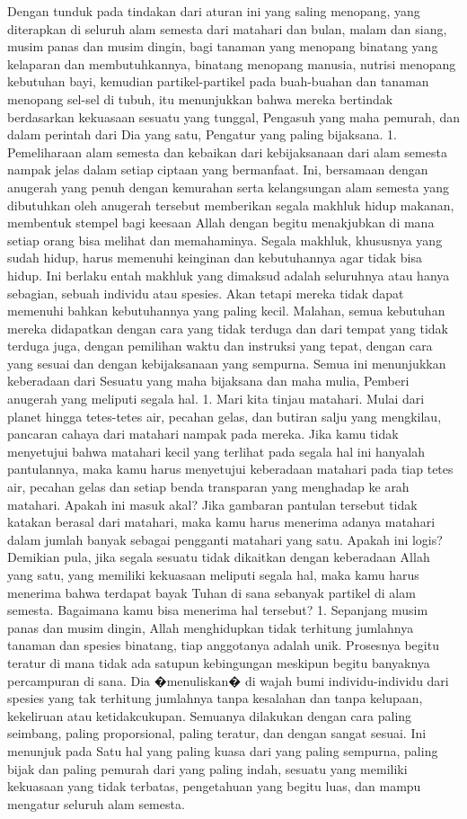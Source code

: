 \documentclass[]{article}
\begin{document}
Dengan tunduk pada tindakan dari aturan ini yang saling menopang, yang diterapkan di seluruh alam semesta dari matahari dan bulan, malam dan siang, musim panas dan musim dingin, bagi tanaman yang menopang binatang yang kelaparan dan membutuhkannya, binatang menopang manusia, nutrisi menopang kebutuhan bayi, kemudian partikel-partikel  pada buah-buahan dan tanaman menopang sel-sel di tubuh, itu  menunjukkan bahwa mereka bertindak berdasarkan kekuasaan sesuatu yang tunggal, Pengasuh yang maha pemurah, dan dalam perintah dari Dia yang satu, Pengatur yang paling bijaksana. 
1. Pemeliharaan alam semesta dan kebaikan dari kebijaksanaan dari alam semesta nampak jelas dalam setiap ciptaan yang bermanfaat.  Ini, bersamaan dengan anugerah yang penuh dengan kemurahan serta kelangsungan alam semesta yang dibutuhkan oleh anugerah tersebut memberikan segala makhluk hidup makanan,  membentuk stempel bagi keesaan Allah dengan begitu menakjubkan di mana setiap orang bisa melihat dan memahaminya.
Segala makhluk, khususnya yang sudah hidup, harus memenuhi keinginan dan kebutuhannya agar tidak bisa hidup. Ini berlaku entah makhluk yang dimaksud adalah seluruhnya atau hanya sebagian, sebuah individu atau spesies. Akan tetapi mereka tidak dapat memenuhi bahkan kebutuhannya yang paling kecil. Malahan, semua kebutuhan mereka didapatkan dengan cara yang tidak terduga dan dari tempat yang tidak terduga juga, dengan pemilihan waktu dan instruksi yang tepat, dengan cara yang sesuai dan dengan kebijaksanaan yang sempurna. Semua ini menunjukkan keberadaan dari Sesuatu yang maha bijaksana dan maha mulia, Pemberi anugerah yang meliputi segala hal. 
1. Mari kita tinjau matahari. Mulai dari planet hingga tetes-tetes air, pecahan gelas, dan butiran salju yang mengkilau, pancaran cahaya dari matahari nampak pada mereka. Jika kamu tidak menyetujui bahwa matahari kecil yang  terlihat pada segala hal ini  hanyalah pantulannya, maka kamu harus menyetujui keberadaan matahari pada tiap tetes air, pecahan gelas dan setiap benda transparan yang menghadap ke arah matahari. Apakah ini masuk akal?
Jika gambaran pantulan tersebut tidak katakan berasal dari matahari, maka kamu harus menerima adanya matahari dalam jumlah banyak sebagai pengganti matahari yang satu. Apakah  ini logis? Demikian pula,  jika segala sesuatu tidak dikaitkan dengan keberadaan Allah yang satu, yang memiliki kekuasaan meliputi segala hal, maka kamu harus menerima bahwa terdapat  bayak Tuhan di sana sebanyak partikel di alam semesta. Bagaimana kamu bisa menerima hal tersebut? 
1. Sepanjang musim panas dan musim dingin, Allah menghidupkan tidak terhitung jumlahnya tanaman dan spesies binatang, tiap anggotanya adalah unik. Prosesnya begitu teratur di mana tidak ada satupun kebingungan meskipun begitu banyaknya percampuran di sana. Dia �menuliskan� di wajah bumi individu-individu dari spesies yang tak terhitung jumlahnya tanpa kesalahan dan tanpa kelupaan, kekeliruan atau ketidakcukupan. Semuanya dilakukan dengan cara paling seimbang, paling proporsional,  paling teratur, dan dengan sangat sesuai. Ini menunjuk pada Satu hal yang paling kuasa dari yang paling sempurna, paling bijak dan paling pemurah dari yang paling indah, sesuatu yang memiliki kekuasaan yang tidak terbatas, pengetahuan yang begitu luas, dan mampu mengatur seluruh alam semesta.
\end{document}
